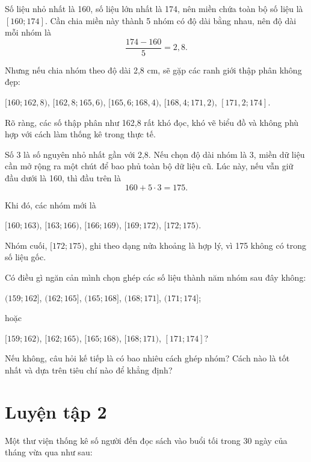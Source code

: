 \documentclass[
  letterpaper,
  DIV=11,
  numbers=noendperiod]{scrartcl}
\begin{document}
Số liệu nhỏ nhất là 160, số liệu lớn nhất là 174, nên miền chứa toàn bộ
số liệu là \([160; 174]\). Cần chia miền này thành 5 nhóm có độ dài bằng
nhau, nên độ dài mỗi nhóm là \[
    \frac{174-160}{5}=2,8.
\]

Nhưng nếu chia nhóm theo độ dài 2,8 cm, sẽ gặp các ranh giới thập phân
không đẹp:

\([160;162,8)\), \([162,8;165,6)\), \([165,6;168,4)\),
\([168,4;171,2)\), \([171,2;174]\).

Rõ ràng, các số thập phân như 162,8 rất khó đọc, khó vẽ biểu đồ và không
phù hợp với cách làm thống kê trong thực tế.

Số 3 là số nguyên nhỏ nhất gần với 2,8. Nếu chọn độ dài nhóm là 3, miền
dữ liệu cần mở rộng ra một chút để bao phủ toàn bộ dữ liệu cũ. Lúc này,
nếu vẫn giữ đầu dưới là 160, thì đầu trên là \[
    160+5\cdot 3 = 175.
\]

Khi đó, các nhóm mới là

\([160;163)\), \([163;166)\), \([166;169)\), \([169;172)\),
\([172;175)\).

Nhóm cuối, \([172; 175)\), ghi theo dạng nửa khoảng là hợp lý, vì 175
không có trong số liệu gốc.

\begin{tcolorbox}[enhanced jigsaw, opacityback=0, opacitybacktitle=0.6, colback=white, left=2mm, arc=.35mm, toprule=.15mm, title={Khám phá}, bottomtitle=1mm, coltitle=black, breakable, bottomrule=.15mm, rightrule=.15mm, colbacktitle=quarto-callout-note-color!10!white, leftrule=.75mm, colframe=quarto-callout-note-color-frame, toptitle=1mm, titlerule=0mm]

Có điều gì ngăn cản mình chọn ghép các số liệu thành năm nhóm sau đây
không:

\((159;162]\), \((162;165]\), \((165;168]\), \((168;171]\),
\((171;174]\);

hoặc

\([159;162)\), \([162;165)\), \([165;168)\), \([168;171)\),
\([171;174]\)?

Nếu không, câu hỏi kế tiếp là có bao nhiêu cách ghép nhóm? Cách nào là
tốt nhất và dựa trên tiêu chí nào để khẳng định?

\end{tcolorbox}

\section*{Luyện tập 2}

Một thư viện thống kê số người đến đọc sách vào buổi tối trong 30 ngày
của tháng vừa qua như sau:
\end{document}
